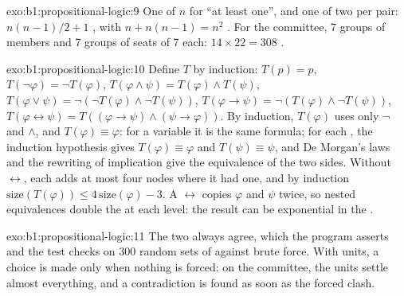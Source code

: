 \begin{solution}{exo:b1:propositional-logic:9}
One  of $n$  for ``at least one'', and one  of two  per pair: $n(n - 1)/2 + 1$ , with
$n + n(n - 1) = n^2$ . For the committee, 7 groups of members and 7 groups of seats of 7  each: $14
\times 22 = 308$ .
\end{solution}

\begin{solution}{exo:b1:propositional-logic:10}
Define $T$ by induction: $T(p) = p$, $T(\neg\varphi) = \neg T(\varphi)$, $T(\varphi \wedge \psi) = T(\varphi) \wedge
T(\psi)$, $T(\varphi \vee \psi) = \neg(\neg T(\varphi) \wedge \neg T(\psi))$, $T(\varphi \rightarrow \psi) = \neg(T(\varphi)
\wedge \neg T(\psi))$, $T(\varphi \leftrightarrow \psi) = T((\varphi \rightarrow \psi) \wedge (\psi \rightarrow \varphi))$.
By induction, $T(\varphi)$ uses only $\neg$ and $\wedge$, and $T(\varphi) \equiv \varphi$: for a variable it is the
same formula; for each , the induction hypothesis gives $T(\varphi) \equiv \varphi$ and $T(\psi) \equiv \psi$,
and De Morgan's laws and the rewriting of implication give the equivalence of the two sides. Without
$\leftrightarrow$, each  adds at most four nodes where it had one, and by induction $\text{size}(T(\varphi))
\leq 4\,\text{size}(\varphi) - 3$. A $\leftrightarrow$ copies $\varphi$ and $\psi$ twice, so nested equivalences double
the  at each level: the result can be exponential in the .
\end{solution}

\begin{solution}{exo:b1:propositional-logic:11}
The two always agree, which the program asserts and the test  checks on 300 random sets of
 against brute force. With units, a choice is made only when nothing is forced: on the committee, the units
settle almost everything, and a contradiction is found as soon as the forced  clash.
\end{solution}

